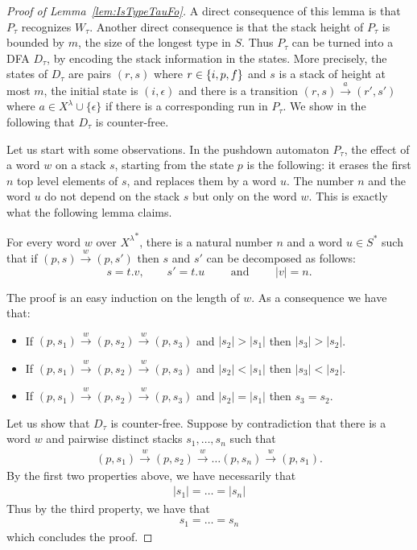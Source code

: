 \begin{proof}[Proof of Lemma~\ref{lem:IsTypeTauFo}]
A direct consequence of this lemma is that $P_\tau$ recognizes $W_\tau$. Another direct consequence is that the stack height of $P_\tau$ is bounded by $m$, the size of the longest type in $S$. Thus $P_\tau$ can be turned into a DFA $D_\tau$, by encoding the stack information in the states. More precisely, the states of $D_\tau$ are pairs $(r,s)$ where $r\in \{i,p,f\}$ and $s$ is a stack of height at most $m$, the initial state is $(i,\epsilon)$ and there is a transition $(r,s)\xrightarrow{a}(r',s')$ where $a\in X^\lambda\cup\{\epsilon\}$ if there is a corresponding run in $P_\tau$. We show in the following that $D_\tau$ is counter-free. 

Let us start with some observations. In the pushdown automaton $P_\tau$, the effect of a word $w$ on a stack $s$, starting from the state $p$ is the following: it erases the first $n$ top level elements of $s$, and replaces them by a word $u$. The number $n$ and the word $u$ do not depend on the stack $s$ but only on the word $w$. This is exactly what the following lemma claims.

\begin{lemma}
For every word $w$ over ${X^\lambda}^*$, there is a natural number $n$ and a word $u\in S^*$ such that if $(p,s)\xrightarrow{w}(p,s')$ then $s$ and $s'$ can be decomposed as follows:
$$s=t.v,\qquad s'=t.u\qquad \text{ and }\qquad |v|=n.$$
\end{lemma}
The proof is an easy induction on the length of $w$. As a consequence we have that:
\begin{itemize}
\item If $(p,s_1)\xrightarrow{w}(p,s_2)\xrightarrow{w}(p,s_3)$ and $|s_2|>|s_1|$ then $|s_3|>|s_2|$.
\item If $(p,s_1)\xrightarrow{w}(p,s_2)\xrightarrow{w}(p,s_3)$ and $|s_2|<|s_1|$ then $|s_3|<|s_2|$.
\item If $(p,s_1)\xrightarrow{w}(p,s_2)\xrightarrow{w}(p,s_3)$ and $|s_2|=|s_1|$ then $s_3 =s_2$.
\end{itemize}

Let us show that $D_\tau$ is counter-free. Suppose by contradiction that there is a word $w$ and pairwise distinct stacks $s_1,\dots, s_n$ such that 
\begin{align*}
(p,s_1)\xrightarrow{w}(p,s_2)\xrightarrow{w}\dots(p,s_n)\xrightarrow{w}(p,s_1).
\end{align*} 
By the first two properties above, we have necessarily that 
\begin{align*}
|s_1|=\dots=|s_n|
\end{align*}
 Thus by the third property, we have that 
\begin{align*}
 s_1=\dots=s_n
\end{align*} 
 which concludes the proof.
\end{proof}



